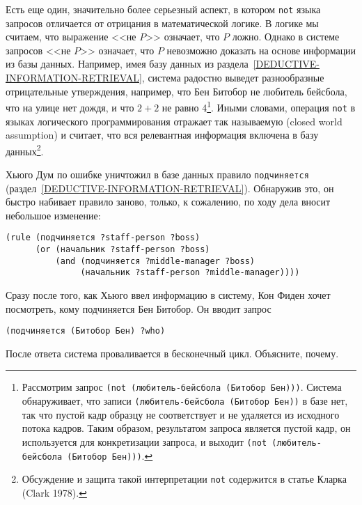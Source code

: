 Есть еще один, значительно более серьезный аспект, в
котором {\tt not} языка запросов отличается от отрицания в
математической логике.  В логике мы считаем, что выражение <<не
$P$>> означает, что $P$ ложно.  Однако в системе
запросов <<не $P$>> означает, что $P$ невозможно
доказать на основе информации из базы данных.  Например, имея базу
данных из раздела~\ref{DEDUCTIVE-INFORMATION-RETRIEVAL},
система радостно выведет разнообразные отрицательные утверждения,
например, что Бен Битобор не любитель бейсбола, что на улице нет
дождя, и что $2+2$ не равно 4\footnote{Рассмотрим запрос {\tt (not 
(любитель-бейсбола (Битобор Бен)))}.  Система обнаруживает, что записи 
{\tt (любитель-бейсбола (Битобор Бен))} в базе нет, так что пустой кадр 
образцу не 
соответствует и не удаляется из исходного потока кадров.  Таким
образом, результатом запроса является пустой кадр, он используется
для конкретизации запроса, и выходит {\tt (not (любитель-бейсбола
(Битобор Бен)))}.}.
Иными словами, операция {\tt not} в языках логического
программирования отражает так называемую 
 (closed world assumption) и считает, что вся релевантная информация 
включена в базу
данных\footnote{Обсуждение и защита такой интерпретации
{\tt not} содержится в статье Кларка (Clark 1978).}.

\begin{exercise}{4.64}%
\label{EX4.64}%
Хьюго Дум по ошибке уничтожил в базе данных правило
{\tt подчиняется} (раздел~\ref{DEDUCTIVE-INFORMATION-RETRIEVAL}).
Обнаружив это, он быстро набивает правило заново, только, к сожалению,
по ходу дела вносит небольшое изменение:

\begin{Verbatim}[fontsize=\small]
(rule (подчиняется ?staff-person ?boss)
      (or (начальник ?staff-person ?boss)
          (and (подчиняется ?middle-manager ?boss)
               (начальник ?staff-person ?middle-manager))))
\end{Verbatim}
Сразу после того, как Хьюго ввел информацию в систему, Кон Фиден хочет
посмотреть, кому подчиняется Бен Битобор.  Он вводит запрос

\begin{Verbatim}[fontsize=\small]
(подчиняется (Битобор Бен) ?who)
\end{Verbatim}
После ответа система проваливается в бесконечный цикл.  Объясните,
почему.
\end{exercise}

